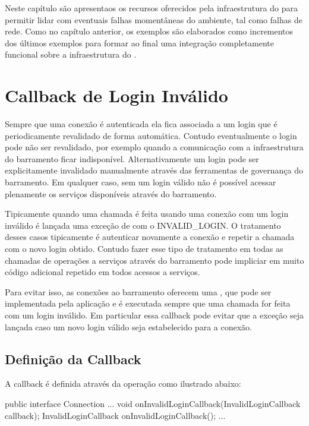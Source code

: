 Neste capítulo são apresentaos os recursos oferecidos pela infraestrutura do \openbus{} para permitir lidar com eventuais falhas momentâneas do ambiente, tal como falhas de rede.
Como no capítulo anterior, os exemplos são elaborados como incrementos dos últimos exemplos para formar ao final uma integração completamente funcional sobre a infraestrutura do \openbus{}.

\section{Callback de Login Inválido} \label{sec:invlogincallback}

Sempre que uma conexão é autenticada ela fica associada a um login que é periodicamente revalidado de forma automática.
Contudo eventualmente o login pode não ser revalidado, por exemplo quando a comunicação com a infraestrutura do barramento ficar indisponível.
Alternativamente um login pode ser explicitamente invalidado manualmente através das ferramentas de governança do barramento.
Em qualquer caso, sem um login válido não é possível acessar plenamente os serviços disponíveis através do barramento.

Tipicamente quando uma chamada é feita usando uma conexão com um login inválido é lançada uma exceção de  com o  INVALID_LOGIN.
O tratamento desses casos tipicamente é autenticar novamente a conexão e repetir a chamada com o novo login obtido.
Contudo fazer esse tipo de tratamento em todas as chamadas de operações a serviços através do barramento pode impliciar em muito código adicional repetido em todos acessos a serviços.

Para evitar isso, as conexões ao barramento oferecem uma , que pode ser implementada pela aplicação e é executada sempre que uma chamada for feita com um login inválido.
Em particular essa callback pode evitar que a exceção  seja lançada caso um novo login válido seja estabelecido para a conexão.

\subsection{Definição da Callback}

A callback é definida através da operação  como ilustrado abaixo:

\begin{samplecode}
public interface Connection {
  ...
  void onInvalidLoginCallback(InvalidLoginCallback callback);
  InvalidLoginCallback onInvalidLoginCallback();
  ...
}
\end{samplecode}

